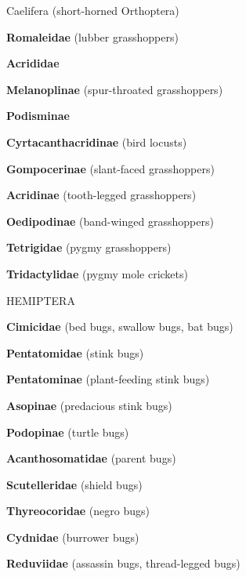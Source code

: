 \documentclass[letterpaper,10pt]{article}
\begin{document}
{\makebox[0.20cm]{}  Caelifera (short-horned Orthoptera) \par
\makebox[0.6cm]{}  \textbf{Romaleidae} (lubber grasshoppers) \par
\makebox[0.6cm]{}  \textbf{Acrididae} \par
\makebox[0.80cm]{}  \textbf{Melanoplinae} (spur-throated grasshoppers) \par
\makebox[0.80cm]{}  \textbf{Podisminae} \par
\makebox[0.80cm]{}  \textbf{Cyrtacanthacridinae} (bird locusts) \par
\makebox[0.80cm]{}  \textbf{Gompocerinae} (slant-faced grasshoppers) \par
\makebox[0.80cm]{}  \textbf{Acridinae} (tooth-legged grasshoppers) \par
\makebox[0.80cm]{}  \textbf{Oedipodinae} (band-winged grasshoppers) \par
\makebox[0.6cm]{}  \textbf{Tetrigidae} (pygmy grasshoppers) \par
\makebox[0.6cm]{}  \textbf{Tridactylidae} (pygmy mole crickets) \par
%
%
%
\makebox[0.0cm]{}  HEMIPTERA \par
\makebox[0.6cm]{}  \textbf{Cimicidae} (bed bugs, swallow bugs, bat bugs) \par
\makebox[0.6cm]{}  \textbf{Pentatomidae} (stink bugs) \par
\makebox[0.80cm]{}  \textbf{Pentatominae} (plant-feeding stink bugs) \par
\makebox[0.80cm]{}  \textbf{Asopinae} (predacious stink bugs) \par
\makebox[0.80cm]{}  \textbf{Podopinae} (turtle bugs) \par
\makebox[0.6cm]{}  \textbf{Acanthosomatidae} (parent bugs) \par
\makebox[0.6cm]{}  \textbf{Scutelleridae} (shield bugs) \par
\makebox[0.6cm]{}  \textbf{Thyreocoridae} (negro bugs) \par
\makebox[0.6cm]{}  \textbf{Cydnidae} (burrower bugs) \par
\makebox[0.6cm]{}  \textbf{Reduviidae} (assassin bugs, thread-legged bugs) \par
}
\end{document}
